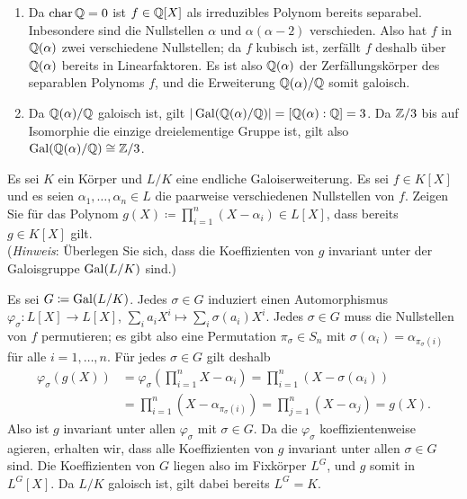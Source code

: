 \begin{solution}
\begin{enumerate}
    \item
      Da $\operatorname{char} \mathbb{Q} = 0$ ist $f \in \mathbb{Q}[X]$ als irreduzibles Polynom bereits separabel.
      Inbesondere sind die Nullstellen $\alpha$ und $\alpha (\alpha - 2)$ verschieden.
      Also hat $f$ in $\mathbb{Q}(\alpha)$ zwei verschiedene Nullstellen; da $f$ kubisch ist, zerfällt $f$ deshalb über $\mathbb{Q}(\alpha)$ bereits in Linearfaktoren.
      Es ist also $\mathbb{Q}(\alpha)$ der Zerfällungskörper des separablen Polynoms $f$, und die Erweiterung $\mathbb{Q}(\alpha)/\mathbb{Q}$ somit galoisch.
%       
    \item
      Da $\mathbb{Q}(\alpha)/\mathbb{Q}$ galoisch ist, gilt $|\operatorname{Gal}(\mathbb{Q}(\alpha)/\mathbb{Q})| = [\mathbb{Q}(\alpha) : \mathbb{Q}] = 3$.
      Da $\mathbb{Z}/3$ bis auf Isomorphie die einzige dreielementige Gruppe ist, gilt also $\operatorname{Gal}(\mathbb{Q}(\alpha)/\mathbb{Q}) \cong \mathbb{Z}/3$.
  \end{enumerate}
\end{solution}


\begin{question}[subtitle = Produkt von Linearfaktoren]
  Es sei $K$ ein Körper und $L/K$ eine endliche Galoiserweiterung.
  Es sei $f \in K[X]$ und es seien $\alpha_1, \dotsc, \alpha_n \in L$ die paarweise verschiedenen Nullstellen von $f$.
  Zeigen Sie für das Polynom $g(X) \coloneqq \prod_{i=1}^n (X - \alpha_i) \in L[X]$, dass bereits $g \in K[X]$ gilt.
  \\
  (\emph{Hinweis}:
   Überlegen Sie sich, dass die Koeffizienten von $g$ invariant unter der Galoisgruppe $\operatorname{Gal}(L/K)$ sind.)
\end{question}


\begin{solution}
  Es sei $G \coloneqq \operatorname{Gal}(L/K)$.
  Jedes $\sigma \in G$ induziert einen Automorphismus $\varphi_\sigma \colon L[X] \to L[X]$, $\sum_i a_i X^i \mapsto \sum_i \sigma(a_i) X^i$.
  Jedes $\sigma \in G$ muss die Nullstellen von $f$ permutieren;
  es gibt also eine Permutation $\pi_\sigma \in S_n$ mit $\sigma(\alpha_i) = \alpha_{\pi_\sigma(i)}$ für alle $i = 1, \dotsc, n$.
  Für jedes $\sigma \in G$ gilt deshalb
  \begin{align*}
        \varphi_\sigma( g(X) )
    &=  \varphi_\sigma\left( \prod_{i=1}^n X - \alpha_i \right)
     =  \prod_{i=1}^n ( X - \sigma(\alpha_i) )
    \\
    &=  \prod_{i=1}^n ( X- \alpha_{\pi_\sigma(i)} )
     =  \prod_{j=1}^n ( X - \alpha_j )
     =  g(X).
  \end{align*}
  Also ist $g$ invariant unter allen $\varphi_\sigma$ mit $\sigma \in G$.
  Da die $\varphi_\sigma$ koeffizientenweise agieren, erhalten wir, dass alle Koeffizienten von $g$ invariant unter allen $\sigma \in G$ sind.
  Die Koeffizienten von $G$ liegen also im Fixkörper $L^G$, und $g$ somit in $L^G[X]$.
  Da $L/K$ galoisch ist, gilt dabei bereits $L^G = K$.
\end{solution}



